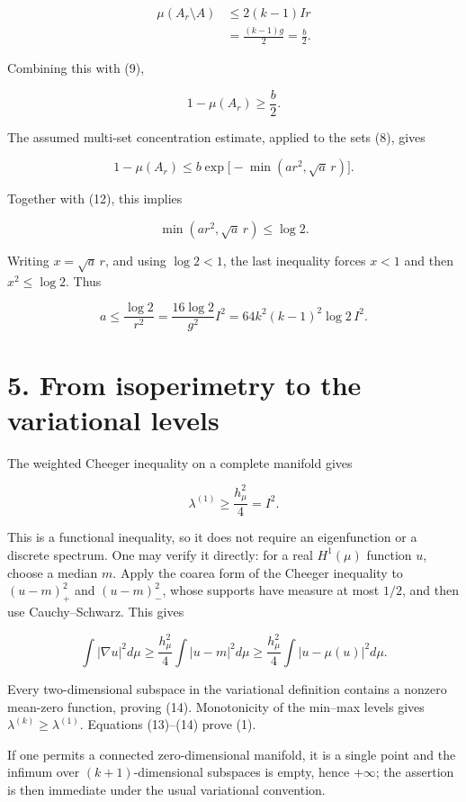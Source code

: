 \documentclass[11pt,a4paper]{article}
\begin{document}
\[
\begin{aligned}
\mu(A_r\setminus A)
&\leq2(k-1)Ir\\
&=\frac{(k-1)g}{2}
=\frac b2.
\end{aligned}
\]

Combining this with (9),

\[
1-\mu(A_r)\geq\frac b2.
\tag{12}
\]

The assumed multi-set concentration estimate, applied to the sets (8),
gives

\[
1-\mu(A_r)
\leq b\exp\bigl[-\min(ar^2,\sqrt a\,r)\bigr].
\]

Together with (12), this implies

\[
\min(ar^2,\sqrt a\,r)\leq\log2.
\]

Writing \(x=\sqrt a\,r\), and using \(\log2<1\), the last inequality
forces \(x<1\) and then \(x^2\leq\log2\). Thus

\[
a\leq\frac{\log2}{r^2}
=\frac{16\log2}{g^2}I^2
=64k^2(k-1)^2\log2\,I^2.
\tag{13}
\]

\hypertarget{1013-from-isoperimetry-to-the-variational-levels}{%
\section{5. From isoperimetry to the variational
levels}\label{1013-from-isoperimetry-to-the-variational-levels}}

The weighted Cheeger inequality on a complete manifold gives

\[
\lambda^{(1)}\geq\frac{h_\mu^2}{4}=I^2.
\tag{14}
\]

This is a functional inequality, so it does not require an eigenfunction
or a discrete spectrum. One may verify it directly: for a real
\(H^1(\mu)\) function \(u\), choose a median \(m\). Apply the coarea
form of the Cheeger inequality to \((u-m)_+^2\) and \((u-m)_-^2\), whose
supports have measure at most \(1/2\), and then use Cauchy--Schwarz.
This gives

\[
\int|\nabla u|^2d\mu
\geq\frac{h_\mu^2}{4}\int|u-m|^2d\mu
\geq\frac{h_\mu^2}{4}\int|u-\mu(u)|^2d\mu.
\]

Every two-dimensional subspace in the variational definition contains a
nonzero mean-zero function, proving (14). Monotonicity of the min--max
levels gives \(\lambda^{(k)}\geq\lambda^{(1)}\). Equations (13)--(14)
prove (1).

If one permits a connected zero-dimensional manifold, it is a single
point and the infimum over \((k+1)\)-dimensional subspaces is empty,
hence \(+\infty\); the assertion is then immediate under the usual
variational convention.
\end{document}
